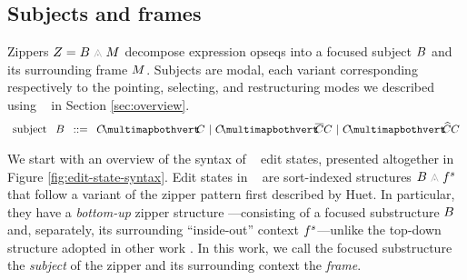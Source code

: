 \subsection{Subjects and frames} \label{sec:subjects-and-frames}
Zippers $\editState = \zipper{\subject}{\zframe}$ decompose
expression opseqs into a focused subject $B$ and
its surrounding frame $M$.
Subjects are modal, each variant corresponding respectively
to the pointing, selecting, and restructuring modes we
described using \tylr~ in Section \ref{sec:overview}.
\[\arraycolsep=4pt\begin{array}{rlrl}
  \text{subject} & \subject & ::= &
  \pointing{\selection}{\selection} ~\vert~
  \selecting{\selection}{\selection}{\selection} ~\vert~
  \restructuring{\selection}{\selection}{\selection}
\end{array}\]





We start with an overview of the syntax of \ty~ edit states,
presented altogether in Figure \ref{fig:edit-state-syntax}.
Edit states in \ty~ are sort-indexed structures
$\zipper{\subject}{\tfrelem^s}$ that follow a variant
of the zipper pattern first described by Huet.
In particular, they have a \emph{bottom-up}
zipper structure ---consisting of a focused substructure
$B$ and, separately,
its surrounding ``inside-out'' context $f^s$---unlike
the top-down structure adopted in other work .
In this work, we call the focused substructure the \emph{subject} of
the zipper and its surrounding context the \emph{frame}.



